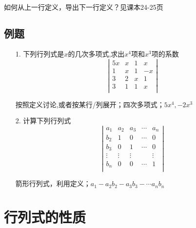 \begin{remark}
	如何从上一行定义，导出下一行定义？见课本\cite{book1}24-25页
\end{remark}

\subsection*{例题}
\begin{itemize}
    \item[1.] 下列行列式是$x$的几次多项式,求出$x^4$项和$x^3$项的系数
    \begin{equation}
    \nonumber
    \left|
        \begin{array}{rrrr}
        5x &x &1 &x\\
        1  &x &1 &-x\\
        3  &2 &x &1\\
        3  &1 &1 &x\\
        \end{array}
    \right|
    \end{equation} 
	\begin{solution}
		按照定义讨论,或者按某行/列展开；四次多项式；$5x^4, -2x^3$
	\end{solution}
    \vspace{2cm}

    \item[2.] 计算下列行列式
    \begin{equation}
    \nonumber
    \left|
        \begin{array}{rrrrr}
        a_1 &a_2 &a_3 &\cdots &a_n\\
        b_2 &1   &0   &\cdots &0\\
        b_3 &0   &1   &\cdots &0\\
        \vdots &\vdots   &\vdots   & &\vdots\\
        b_n &0   &0   &\cdots &1\\
        \end{array}
    \right|
    \end{equation}
	\begin{solution}
		箭形行列式，利用定义；$a_1 - a_2b_2 - a_3b_3 - \cdots a_n b_n$
	\end{solution}
    \vspace{2cm}
\end{itemize}

\section{行列式的性质}
